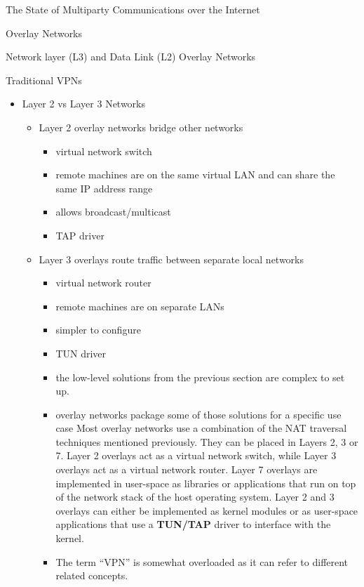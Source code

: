 \begin{frame}[fragile]{The State of Multiparty Communications over the
Internet}
\begin{block}{Overlay Networks}
\begin{block}{Network layer (L3) and Data Link (L2) Overlay Networks}
\begin{block}{Traditional VPNs}
\begin{itemize}
\tightlist
\item
  Layer 2 vs Layer 3 Networks

  \begin{itemize}
  \tightlist
  \item
    Layer 2 overlay networks bridge other networks

    \begin{itemize}
    \tightlist
    \item
      virtual network switch
    \item
      remote machines are on the same virtual LAN and can share the same
      IP address range
    \item
      allows broadcast/multicast
    \item
      TAP driver
    \end{itemize}
  \item
    Layer 3 overlays route traffic between separate local networks

    \begin{itemize}
    \item
      virtual network router
    \item
      remote machines are on separate LANs
    \item
      simpler to configure
    \item
      TUN driver
    \item
      the low-level solutions from the previous section are complex to
      set up.
    \item
      overlay networks package some of those solutions for a specific
      use case Most overlay networks use a combination of the NAT
      traversal techniques mentioned previously. They can be placed in
      Layers 2, 3 or 7. Layer 2 overlays act as a virtual network
      switch, while Layer 3 overlays act as a virtual network router.
      Layer 7 overlays are implemented in user-space as libraries or
      applications that run on top of the network stack of the host
      operating system. Layer 2 and 3 overlays can either be implemented
      as kernel modules or as user-space applications that use a
      \textbf{TUN/TAP}  driver to interface with
      the kernel.
    \end{itemize}


    \begin{itemize}
    \tightlist
    \item
      The term ``VPN'' is somewhat overloaded as it can refer to
      different related concepts.
    \end{itemize}


\end{itemize}
\end{itemize}
\end{block}
\end{block}
\end{block}
\end{frame}
